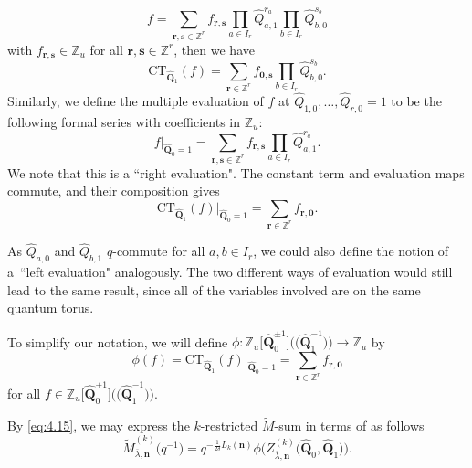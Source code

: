 \documentclass[pdftex]{sigma}
\numberwithin{equation}{section}
\begin{document}
\begin{equation*}
f=\sum_{\mathbf{r},\mathbf{s}\in\mathbb{Z}^r}f_{\mathbf{r},\mathbf{s}}\prod_{a\in I_r}\widehat{Q}_{a,1}^{r_a}\prod_{b\in I_r}\widehat{Q}_{b,0}^{s_b}
\end{equation*}
with $f_{\mathbf{r},\mathbf{s}}\in\mathbb{Z}_u$ for all $\mathbf{r},\mathbf{s}\in\mathbb{Z}^r$, then we have
\begin{equation*}
\mathrm{CT}_{\widehat{\mathbf{Q}}_1}(f)=\sum_{\mathbf{r}\in\mathbb{Z}^r}f_{\mathbf{0},\mathbf{s}}\prod_{b\in I_r}\widehat{Q}_{b,0}^{s_b}.
\end{equation*}
Similarly, we define the multiple evaluation of $f$ at $\widehat{Q}_{1,0},\dots,\widehat{Q}_{r,0}=1$ to be the following formal series with coefficients in $\mathbb{Z}_u$:
\begin{equation*}
f|_{\widehat{\mathbf{Q}}_0=1}=\sum_{\mathbf{r},\mathbf{s}\in\mathbb{Z}^r}f_{\mathbf{r},\mathbf{s}}\prod_{a\in I_r}\widehat{Q}_{a,1}^{r_a}.
\end{equation*}
We note that this is a ``right evaluation". The constant term and evaluation maps commute, and their composition gives
\begin{equation*}
\mathrm{CT}_{\widehat{\mathbf{Q}}_1}(f)|_{\widehat{\mathbf{Q}}_0=1}=\sum_{\mathbf{r}\in\mathbb{Z}^r}f_{\mathbf{r},\mathbf{0}}.
\end{equation*}

\begin{remark*}
As $\widehat{Q}_{a,0}$ and $\widehat{Q}_{b,1}$ $q$-commute for all $a,b\in I_r$, we could also define the notion of a~``left evaluation" analogously. The two different ways of evaluation would still lead to the same result, since all of the variables involved are on the same quantum torus.
\end{remark*}

To simplify our notation, we will define $\phi\colon \mathbb{Z}_u\bigl[\widehat{\mathbf{Q}}_0^{\pm1}\bigr]\bigl(\bigl(\widehat{\mathbf{Q}}_1^{-1}\bigr)\bigr)\to\mathbb{Z}_u$ by
\begin{equation*}
\phi(f)
=\mathrm{CT}_{\widehat{\mathbf{Q}}_1}(f)|_{\widehat{\mathbf{Q}}_0=1}
=\sum_{\mathbf{r}\in\mathbb{Z}^r}f_{\mathbf{r},\mathbf{0}}
\end{equation*}
for all $f\in\mathbb{Z}_u\bigl[\widehat{\mathbf{Q}}_0^{\pm1}\bigr]\bigl(\bigl(\widehat{\mathbf{Q}}_1^{-1}\bigr)\bigr)$.

By \eqref{eq:4.15}, we may express the $k$-restricted $\tilde{M}$-sum  in terms of  as follows
\begin{equation}
\tilde{M}_{\overline{\lambda},\mathbf{n}}^{(k)}\bigl(q^{-1}\bigr)
=q^{-\frac{1}{2\delta}L_k(\mathbf{n})}\phi\bigl(Z_{\overline{ \lambda},\mathbf{n}}^{(k)}\bigl(\widehat{\mathbf{Q}}_0,\widehat{ \mathbf{Q}}_1\bigr)\bigr).\label{eq:4.16}
\end{equation}
\end{document}
